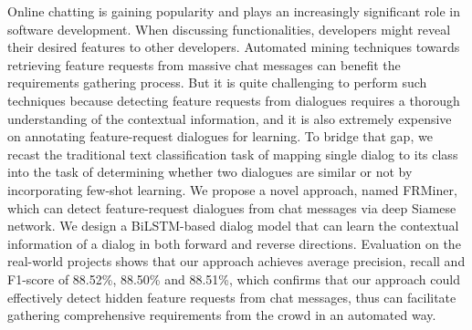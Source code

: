 Online chatting is gaining popularity and plays an increasingly significant role in software development. When discussing functionalities, developers might reveal their desired features to other developers. Automated mining techniques towards retrieving feature requests from massive chat messages can benefit the requirements gathering process. But it is quite challenging to perform such techniques because detecting feature requests from dialogues requires a thorough understanding of the contextual information, and it is also extremely expensive on annotating feature-request dialogues for learning. 
To bridge that gap, we recast the traditional text classification task of mapping single dialog to its class into the task of determining whether two dialogues are similar or not by incorporating few-shot learning. We
propose a novel approach, named FRMiner, which can detect feature-request dialogues from chat messages via deep Siamese network. We design a BiLSTM-based dialog model that can learn the contextual information of a dialog in both forward and reverse directions.
Evaluation on the real-world projects shows that our approach achieves average precision, recall and F1-score of 88.52\%, 88.50\% and 88.51\%, which confirms that our approach could effectively detect hidden feature requests from chat messages, thus can facilitate gathering comprehensive requirements from the crowd in an automated way. 

